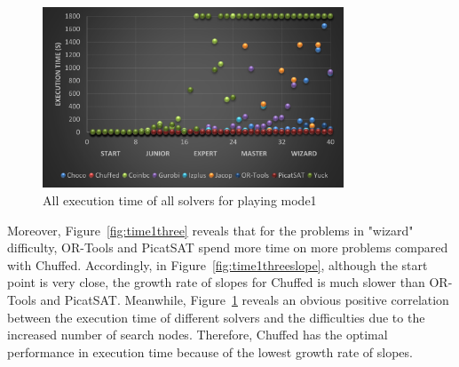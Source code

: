 \begin{figure}[htbp]
\centering
\includegraphics[width=0.8\textwidth]{figs/time1all.png}
\caption{All execution time of all solvers for playing mode1}
\label{fig:mode1time1}
\end{figure}
Moreover, Figure~\ref{fig:time1three} reveals that for the problems in "wizard" difficulty, OR-Tools and PicatSAT spend more time on more problems compared with Chuffed. Accordingly, in Figure~\ref{fig:time1threeslope}, although the start point is very close, the growth rate of slopes for Chuffed is much slower than OR-Tools and PicatSAT. Meanwhile, Figure~\ref{fig:mode1time1} reveals an obvious positive correlation between the execution time of different solvers and the difficulties due to the increased number of search nodes. Therefore, Chuffed has the optimal performance in execution time because of the lowest growth rate of slopes. 

